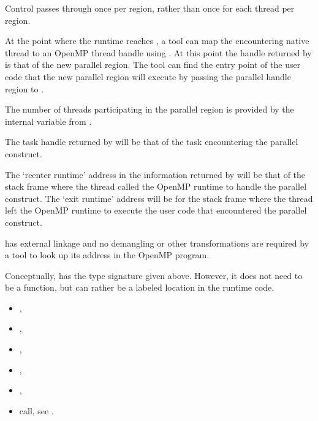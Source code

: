 Control passes through 
once per region, rather than once for each thread per region.

At the point where the runtime reaches ,
a tool can map the encountering native thread to an OpenMP
thread handle using
.
At this point the handle returned by 
is that of the new parallel region.
The tool can find the entry point of the user code that
the new parallel region will execute by passing the parallel handle region
to .

The number of threads participating in the parallel region is provided by
the internal variable  from .

The task handle returned by
will be that of the task encountering the parallel construct.

The `reenter runtime' address in the information returned by
will be that of the stack frame where the thread called the OpenMP
runtime to handle the parallel construct.
The `exit runtime' address will be for the stack frame where the thread
left the OpenMP runtime to execute the user code that encountered
the parallel construct.

\restrictions

 has external  linkage and no
demangling or other transformations are required by a tool
to look up its address in the OpenMP program.

Conceptually,  has the type signature
given above.
However, it does not need to be a function, but can rather be a labeled location
in the runtime code.

\crossreferences

\begin{itemize}
\item
  , 
\item
  , 
\item
  , 
\item
  , 
\item
  , 
\item {} call, see 
  .
\end{itemize}

